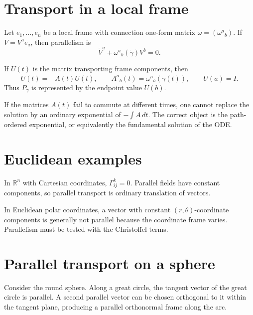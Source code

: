 \section{Transport in a local frame}

Let \(e_1,\dots,e_n\) be a local frame with connection one-form matrix
\(\omega=(\omega^a{}_b)\).  If \(V=V^ae_a\), then parallelism is
\[
\dot V^a
+
\omega^a{}_b(\dot\gamma)V^b
=
0.
\]

\begin{proposition}\label{prop:vii24-fundamental-matrix}
If \(U(t)\) is the matrix transporting frame components, then
\[
\dot U(t)
=
-A(t)U(t),
\qquad
A^a{}_b(t)=\omega^a{}_b(\dot\gamma(t)),
\qquad
U(a)=I.
\]
Thus \(P_\gamma\) is represented by the endpoint value \(U(b)\).
\end{proposition}

\begin{remark}\label{rem:vii24-path-order}
If the matrices \(A(t)\) fail to commute at different times, one cannot replace the
solution by an ordinary exponential of \(-\int A\,dt\).  The correct object is the
path-ordered exponential, or equivalently the fundamental solution of the ODE.
\end{remark}

\section{Euclidean examples}

\begin{example}\label{ex:vii24-euclidean}
In \(\mathbb R^n\) with Cartesian coordinates, \(\Gamma^k_{ij}=0\). Parallel fields
have constant components, so parallel transport is ordinary translation of
vectors.
\end{example}

\begin{example}\label{ex:vii24-polar}
In Euclidean polar coordinates, a vector with constant \((r,\theta)\)-coordinate
components is generally not parallel because the coordinate frame varies.
Parallelism must be tested with the Christoffel terms.
\end{example}

\section{Parallel transport on a sphere}

Consider the round sphere.  Along a great circle, the tangent vector of the great
circle is parallel. A second parallel vector can be chosen orthogonal to it within
the tangent plane, producing a parallel orthonormal frame along the arc.

